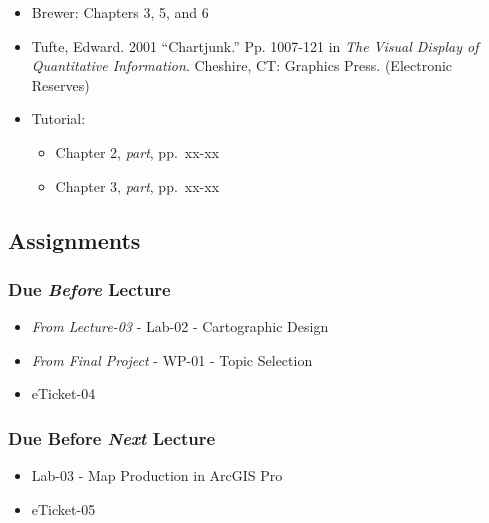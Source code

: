 \documentclass[]{book}
\providecommand{\tightlist}{%
  \setlength{\itemsep}{0pt}\setlength{\parskip}{0pt}}
\begin{document}
\begin{itemize}
\tightlist
\item
  Brewer: Chapters 3, 5, and 6
\item
  Tufte, Edward. 2001 ``Chartjunk.'' Pp. 1007-121 in \emph{The Visual Display of Quantitative Information}. Cheshire, CT: Graphics Press. (Electronic Reserves)
\item
  Tutorial:

  \begin{itemize}
  \tightlist
  \item
    Chapter 2, \emph{part}, pp.~xx-xx
  \item
    Chapter 3, \emph{part}, pp.~xx-xx
  \end{itemize}
\end{itemize}

\hypertarget{assignments-5}{%
\subsection*{Assignments}\label{assignments-5}}

\hypertarget{due-before-lecture-3}{%
\subsubsection*{\texorpdfstring{Due \emph{Before} Lecture}{Due Before Lecture}}\label{due-before-lecture-3}}

\begin{itemize}
\tightlist
\item
  \emph{From Lecture-03} - Lab-02 - Cartographic Design
\item
  \emph{From Final Project} - WP-01 - Topic Selection
\item
  eTicket-04
\end{itemize}

\hypertarget{due-before-next-lecture-2}{%
\subsubsection*{\texorpdfstring{Due Before \emph{Next} Lecture}{Due Before Next Lecture}}\label{due-before-next-lecture-2}}

\begin{itemize}
\tightlist
\item
  Lab-03 - Map Production in ArcGIS Pro
\item
  eTicket-05
\end{itemize}
\end{document}
